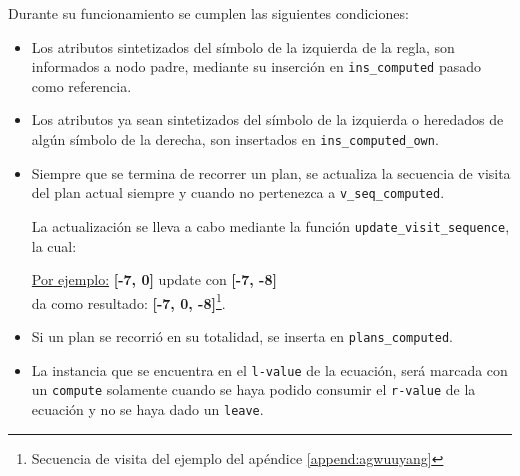 Durante su funcionamiento se cumplen las siguientes condiciones:
\begin{itemize}
\item Los atributos sintetizados del símbolo de la izquierda de la regla, son informados a nodo padre, mediante su inserción en \texttt{ins\_computed} pasado como referencia.

\item Los atributos ya sean sintetizados del símbolo de la izquierda o heredados de algún símbolo de la derecha, son insertados en \texttt{ins\_computed\_own}.

\item Siempre que se termina de recorrer un plan, se actualiza la secuencia de visita del plan actual siempre y cuando no pertenezca a \texttt{v\_seq\_computed}.

La actualización se lleva a cabo mediante la función \texttt{update\_visit\_sequence}, la cual:

\underline{Por ejemplo:}\hspace*{1cm} \textbf{[-7, 0]} update con \textbf{[-7, -8]}\\
\hspace*{2.8cm} da como resultado: \textbf{[-7, 0, -8]}\footnote{Secuencia de visita del ejemplo del apéndice \ref{append:agwuuyang}}.

\item Si un plan se recorrió en su totalidad, se inserta en \texttt{plans\_computed}.

\item La instancia que se encuentra en el \texttt{l-value} de la ecuación, será marcada con un \texttt{compute} solamente cuando se haya podido consumir el \texttt{r-value} de la ecuación y no se haya dado un \texttt{leave}.


\end{itemize}
